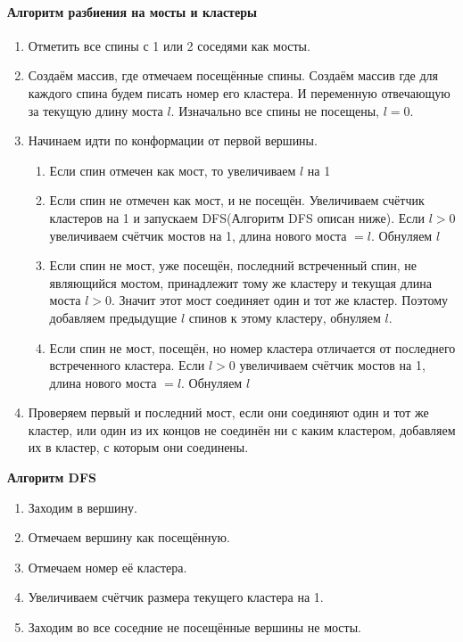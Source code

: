 \paragraph{Алгоритм разбиения на мосты и кластеры}
\begin{enumerate}
	\item Отметить все спины с 1 или 2 соседями как мосты.
	\item Создаём массив, где отмечаем посещённые спины. Создаём массив где для каждого спина будем писать номер его кластера. И переменную отвечающую за текущую длину моста $l$. Изначально все спины не посещены, $l = 0$.
	\item Начинаем идти по конформации от первой вершины.
	\begin{enumerate}
	
		\item Если спин отмечен как мост, то увеличиваем $l$ на 1
		\item Если спин не отмечен как мост, и не посещён. Увеличиваем счётчик кластеров на 1 и запускаем DFS(Алгоритм DFS описан ниже). Если $l > 0$ увеличиваем счётчик мостов на 1, длина нового моста $= l$. Обнуляем $l$
		\item Если спин не мост, уже посещён, последний встреченный спин, не являющийся мостом, принадлежит тому же кластеру и текущая длина моста $l > 0$. Значит этот мост соединяет один и тот же кластер. Поэтому добавляем предыдущие $l$ спинов к этому кластеру, обнуляем $l$.
		\item Если спин не мост, посещён, но номер кластера отличается от последнего встреченного кластера. Если $l > 0$ увеличиваем счётчик мостов на 1, длина нового моста $= l$. Обнуляем $l$
	\end{enumerate}
	\item Проверяем первый и последний мост, если они соединяют один и тот же кластер, или один из их концов не соединён ни с каким кластером, добавляем их в кластер, с которым они соединены.
\end{enumerate}

\textbf{Алгоритм DFS}
\begin{enumerate}
	\item Заходим в вершину.
	\item Отмечаем вершину как посещённую.
	\item Отмечаем номер её кластера.
	\item Увеличиваем счётчик размера текущего кластера на 1.
	\item Заходим во все соседние не посещённые вершины не мосты.
\end{enumerate}

